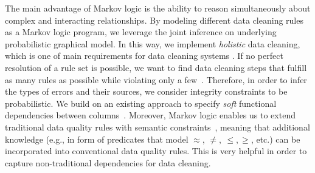 The main advantage of Markov logic is the ability to reason simultaneously about complex and interacting relationships. By modeling different data cleaning rules as a Markov logic program, we leverage the joint inference on underlying probabilistic graphical model. In this way, we implement \textit{holistic} data cleaning, which is one of main requirements for data cleaning systems \cite{fan2013data, Fan:2014:IRM:2628135.2567657, Dallachiesa:2013:NCD:2463676.2465327}. If no perfect resolution of a rule set is possible, we want to find data cleaning steps that fulfill as many rules as possible while violating only a few~\cite{genesereth1987logical, domingos2009markov}. Therefore, in order to infer the types of errors and their sources, we consider integrity constraints to be probabilistic. We build on an existing approach to specify \textit{soft} functional dependencies between columns~\cite{Ilyas:2004:CAD:1007568.1007641}. 
Moreover, Markov logic enables us to extend traditional data quality rules with semantic constraints~\cite{spies2013knowledge}, meaning that additional knowledge (e.g., in form of predicates that model $\approx$, $\neq,~\leq,\geq$, etc.) can be incorporated into conventional data quality rules. This is very helpful in order to capture non-traditional dependencies \cite{chen2009analyses} for data cleaning. %


